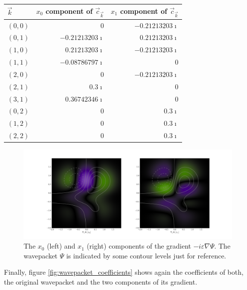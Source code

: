 \begin{center}
\begin{tabular}{l r r}
$\vec{k}$ & $x_0$ component of $\vec{c}_{\vec{k}}$ &  $x_1$ component of $\vec{c}_{\vec{k}}$ \\
\hline
$(0,0)$ &$0$                            & $- 0.21213203 \mathbf{\imath}$ \\
$(0,1)$ &$- 0.21213203 \mathbf{\imath}$ & $0.21213203 \mathbf{\imath}$ \\
$(1,0)$ &$0.21213203 \mathbf{\imath}$   & $- 0.21213203 \mathbf{\imath}$ \\
$(1,1)$ &$- 0.08786797 \mathbf{\imath}$ & $0$  \\
$(2,0)$ &$0$                            & $- 0.21213203 \mathbf{\imath}$ \\
$(2,1)$ &$0.3 \mathbf{\imath}$          & $0$  \\
$(3,1)$ &$0.36742346 \mathbf{\imath}$   & $0$  \\
$(0,2)$ &$0$                            & $0.3 \mathbf{\imath}$ \\
$(1,2)$ &$0$                            & $0.3 \mathbf{\imath}$ \\
$(2,2)$ &$0$                            & $0.3 \mathbf{\imath}$ \\
\end{tabular}

\end{center}\begin{figure}
  \centering
  \includegraphics[scale=0.32]{./fig/wavepacket_gradient.pdf}
  \caption[Plots of the gradient example]
          {The $x_0$ (left) and $x_1$ (right) components of the gradient
           $-i \varepsilon \nabla \Psi$. The wavepacket $\Psi$ is indicated
           by some contour levels just for reference.}
  \label{fig:wavepacket_gradient}
\end{figure}

Finally, figure \ref{fig:wavepacket_coefficients} shows again the coefficients
of both, the original wavepacket and the two components of its gradient.

